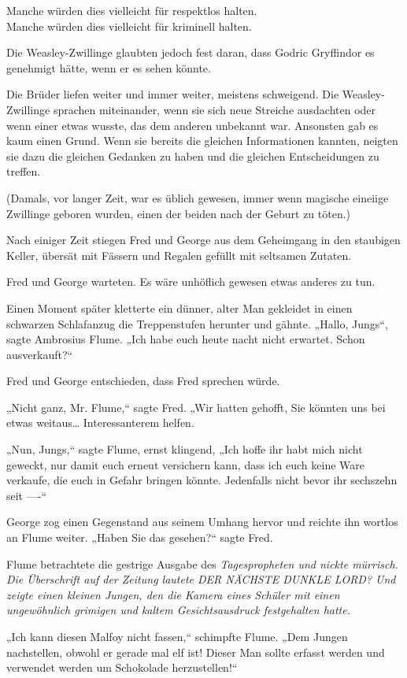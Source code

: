 {Manche würden dies vielleicht für respektlos halten.\\ Manche würden dies vielleicht für kriminell halten.

Die Weasley-Zwillinge glaubten jedoch fest daran, dass Godric Gryffindor es genehmigt hätte, wenn er es sehen könnte.

Die Brüder liefen weiter und immer weiter, meistens schweigend. Die Weasley-Zwillinge sprachen miteinander, wenn sie sich neue Streiche ausdachten oder wenn einer etwas wusste, das dem anderen unbekannt war. Ansonsten gab es kaum einen Grund. Wenn sie bereits die gleichen Informationen kannten, neigten sie dazu die gleichen Gedanken zu haben und die gleichen Entscheidungen zu treffen.

(Damals, vor langer Zeit, war es üblich gewesen, immer wenn magische eineiige Zwillinge geboren wurden, einen der beiden nach der Geburt zu töten.)

Nach einiger Zeit stiegen Fred und George aus dem Geheimgang in den staubigen Keller, übersät mit Fässern und Regalen gefüllt mit seltsamen Zutaten.

Fred und George warteten. Es wäre unhöflich gewesen etwas anderes zu tun.

Einen Moment später kletterte ein dünner, alter Man gekleidet in einen schwarzen Schlafanzug die Treppenstufen herunter und gähnte. „Hallo, Jungs“, sagte Ambrosius Flume. „Ich habe euch heute nacht nicht erwartet. Schon ausverkauft?“

Fred und George entschieden, dass Fred sprechen würde.

„Nicht ganz, Mr. Flume,“ sagte Fred. „Wir hatten gehofft, Sie könnten uns bei etwas weitaus… Interessanterem helfen.

„Nun, Jungs,“ sagte Flume, ernst klingend, „Ich hoffe ihr habt mich nicht geweckt, nur damit euch erneut versichern kann, dass ich euch keine Ware verkaufe, die euch in Gefahr bringen könnte. Jedenfalls nicht bevor ihr sechszehn seit ----“

George zog einen Gegenstand aus seinem Umhang hervor und reichte ihn wortlos an Flume weiter. „Haben Sie das gesehen?“ sagte Fred.

Flume betrachtete die gestrige Ausgabe des \emph{Tagespropheten und nickte mürrisch. Die Überschrift auf der Zeitung lautete DER NÄCHSTE DUNKLE LORD? Und zeigte einen kleinen Jungen, den die Kamera eines Schüler mit einen ungewöhnlich grimigen und kaltem Gesichtsausdruck festgehalten hatte.}

„Ich kann diesen Malfoy nicht fassen,“ schimpfte Flume. „Dem Jungen nachstellen, obwohl er gerade mal elf ist! Dieser Man sollte erfasst werden und verwendet werden um Schokolade herzustellen!“

}
